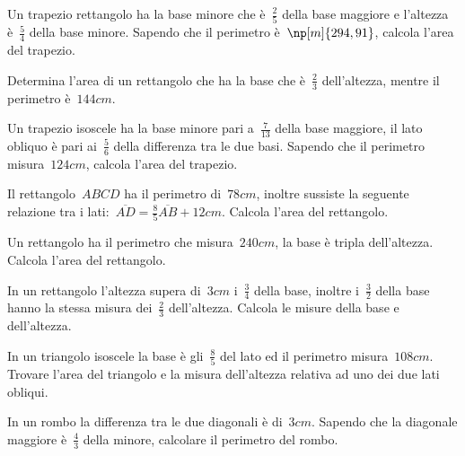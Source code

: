 \begin{multicols}{2}
\begin{esercizio}[\Ast]
\label{ese:16.118}
Un trapezio rettangolo ha la base minore che è~$\frac{2}{5}$ della base maggiore e l'altezza è~$\frac{5}{4}$ della base minore. Sapendo che il perimetro è~$\np[m]{294,91}$, calcola l'area del trapezio.
\end{esercizio}

\begin{esercizio}
\label{ese:16.119}
Determina l'area di un rettangolo che ha la base che è~$\frac{2}{3}$ dell'altezza, mentre il perimetro è~$144\unit{cm}$.
\end{esercizio}

\begin{esercizio}[\Ast]
\label{ese:16.120}
Un trapezio isoscele ha la base minore pari a~$\frac{7}{13}$ della base maggiore, il lato obliquo è pari ai~$\frac{5}{6}$ della differenza tra le due basi. Sapendo che il perimetro misura~$124\unit{cm}$, calcola l'area del trapezio.
\end{esercizio}

\begin{esercizio}[\Ast]
\label{ese:16.121}
Il rettangolo~$ABCD$ ha il perimetro di~$78\unit{cm}$, inoltre sussiste la seguente relazione tra i lati:~$\overline{AD}=\frac{8}{5}\overline{AB}+12\unit{cm}$. Calcola l'area del rettangolo.
\end{esercizio}

\begin{esercizio}[\Ast]
\label{ese:16.122}
Un rettangolo ha il perimetro che misura~$240\unit{cm}$, la base è tripla dell'altezza. Calcola l'area del rettangolo.
\end{esercizio}

\begin{esercizio}[\Ast]
\label{ese:16.123}
In un rettangolo l'altezza supera di~$3\unit{cm}$ i~$\frac{3}{4}$ della base, inoltre i~$\frac{3}{2}$ della base hanno la stessa misura dei~$\frac{2}{3}$ dell'altezza. Calcola le misure della base e dell'altezza.
\end{esercizio}

\begin{esercizio}[\Ast]
\label{ese:16.124}
In un triangolo isoscele la base è gli~$\frac{8}{5}$ del lato ed il perimetro misura~$108\unit{cm}$. Trovare l'area del triangolo e la misura dell'altezza relativa ad uno dei due lati obliqui.
\end{esercizio}

\begin{esercizio}[\Ast]
\label{ese:16.125}
In un rombo la differenza tra le due diagonali è di~$3\unit{cm}$. Sapendo che la diagonale maggiore è~$\frac{4}{3}$ della minore, calcolare il perimetro del rombo.
\end{esercizio}


\end{multicols}

